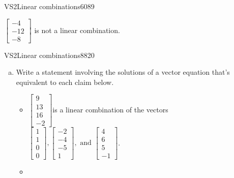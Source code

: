 \begin{exercise}{VS2}{Linear combinations}{6089}
\begin{exerciseAnswer}
\begin{itemize}
 

 \(\left[\begin{array}{c}
-4 \\
-12 \\
-8
\end{array}\right]\) is not a linear combination. 

 
\end{itemize}

     \end{exerciseAnswer}
 \end{exercise}


\begin{exercise}{VS2}{Linear combinations}{8820} 
\begin{exerciseStatement} 

\begin{enumerate}[(a)]
\item  

 Write a statement involving the solutions of a vector equation that's equivalent to each claim below. 

 

\begin{itemize}
\item  

 \(\left[\begin{array}{c}
9 \\
13 \\
16 \\
-2
\end{array}\right]\)is a linear combination of the vectors \(\left[\begin{array}{c}
1 \\
1 \\
0 \\
0
\end{array}\right] , \left[\begin{array}{c}
-2 \\
-4 \\
-5 \\
1
\end{array}\right] , \text{ and } \left[\begin{array}{c}
4 \\
6 \\
5 \\
-1
\end{array}\right]\). 

 
\item  


\end{itemize}
\end{enumerate}
\end{exerciseStatement}
\end{exercise}
